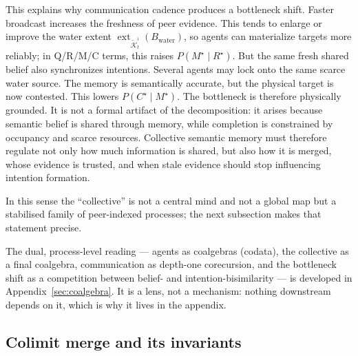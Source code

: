 \documentclass{article}
\begin{document}
This explains why communication cadence produces a bottleneck shift.
Faster broadcast increases the freshness of peer evidence. This tends
to enlarge or improve the water extent
$\operatorname{ext}_{\widetilde{\mathcal{K}}_t^i}(B_{\mathrm{water}})$,
so agents can materialize targets more reliably; in Q/R/M/C terms, this
raises $P(M^\star\mid R^\star)$. But the same fresh shared belief also
synchronizes intentions. Several agents may lock onto the same scarce
water source. The memory is semantically accurate, but the physical
target is now contested. This lowers $P(C^\star\mid M^\star)$. The
bottleneck is therefore physically grounded. It is not a formal
artifact of the decomposition: it arises because semantic belief is
shared through memory, while completion is constrained by occupancy and
scarce resources. Collective semantic memory must therefore regulate
not only how much information is shared, but also how it is merged,
whose evidence is trusted, and when stale evidence should stop
influencing intention formation.

In this sense the ``collective'' is not a central mind and not a global
map but a stabilised family of peer-indexed processes; the next
subsection makes that statement precise.

The dual, process-level reading --- agents as coalgebras (codata), the
collective as a final coalgebra, communication as depth-one
corecursion, and the bottleneck shift as a competition between belief-
and intention-bisimilarity --- is developed in
Appendix~\ref{sec:coalgebra}. It is a lens, not a mechanism: nothing
downstream depends on it, which is why it lives in the appendix.

\subsection{Colimit merge and its invariants}
\label{sec:colimit}
\end{document}

